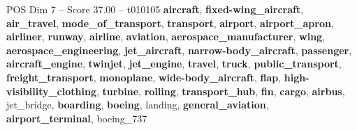 \begin{textsample}{POS Dim 7 – Score 37.00 – t010105}  \label{ex:f7_pos_001}
\textbf{aircraft}, \textbf{fixed-wing\_aircraft}, \textbf{air\_travel}, \textbf{mode\_of\_transport}, \textbf{transport}, \textbf{airport}, \textbf{airport\_apron}, \textbf{airliner}, \textbf{runway}, \textbf{airline}, \textbf{aviation}, \textbf{aerospace\_manufacturer}, \textbf{wing}, \textbf{aerospace\_engineering}, \textbf{jet\_aircraft}, \textbf{narrow-body\_aircraft}, \textbf{passenger}, \textbf{aircraft\_engine}, \textbf{twinjet}, \textbf{jet\_engine}, \textbf{travel}, \textbf{truck}, \textbf{public\_transport}, \textbf{freight\_transport}, \textbf{monoplane}, \textbf{wide-body\_aircraft}, \textbf{flap}, \textbf{high-visibility\_clothing}, \textbf{turbine}, \textbf{rolling}, \textbf{transport\_hub}, \textbf{fin}, \textbf{cargo}, \textbf{airbus}, jet\_bridge, \textbf{boarding}, \textbf{boeing}, landing, \textbf{general\_aviation}, \textbf{airport\_terminal}, boeing\_737

\end{textsample}

